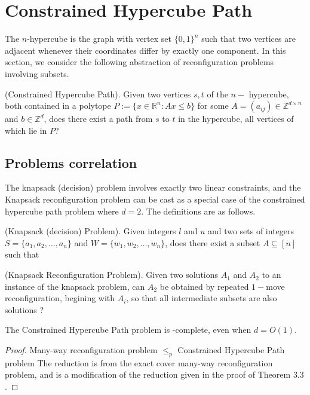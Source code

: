 \chapter{Constrained Hypercube Path}
\label{chap:hypercube}

The $n$-hypercube is the graph with vertex set $\{0, 1\}^n$ such that two vertices are adjacent whenever their coordinates differ by exactly one component. In this section, we consider the following abstraction of reconfiguration problems involving subsets.

\begin{defn}{(Constrained Hypercube Path).} Given two vertices $s, t$ of the $n-$ hypercube, both contained in a polytope $P := \{x \in \mathbb{R}^n : Ax \leq b\}$ for some $A = (a_{ij}) \in \mathbb{Z}^{d \times n}$ and $b \in \mathbb{Z}^d$, does there exist a path from $s$ to $t$
in the hypercube, all vertices of which lie in $P$?
\end{defn}

\section{Problems correlation}
The knapsack (decision) problem involves exactly two linear constraints, and the Knapsack reconfiguration problem can be cast as a special case of the constrained hypercube path problem where $d = 2$. The definitions
are as follows.

\begin{defn}{(Knapsack (decision) Problem).} Given integers $l$ and $u$ and two sets of integers $S = \{a_1, a_2,\dots, a_n\}$ and $W = \{w_1, w_2,\dots, w_n\}$, does there exist a subset $A \subseteq [ n ]$ such that
\end{defn}

\begin{defn}{(Knapsack Reconfiguration Problem).} Given two solutions $A_1$ and $A_2$ to an instance of the knapsack problem, can $A_2$ be obtained by repeated $1-$move reconfiguration, begining with $A_i$, so that all intermediate subsets are also solutions ?
\end{defn}

\begin{theorem}{}The Constrained Hypercube Path problem is \PSPACE-complete, even when $d = O(1)$.
\end{theorem}

\begin{proof}{Many-way reconfiguration problem $\leq_p$ Constrained Hypercube Path problem}
The reduction is from the exact cover many-way reconfiguration problem, and is a modification of the
reduction given in the proof of Theorem $3.3$.  
\end{proof}


